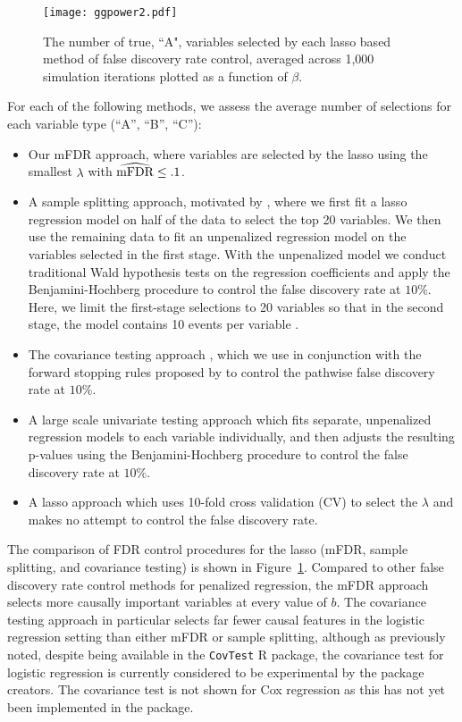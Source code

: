 \begin{figure} [htb!]
 \centering
  \texttt{[image: ggpower2.pdf]}
  \caption{\label{Fig:lassopower} The number of true, ``A", variables selected by each lasso based method of false discovery rate control, averaged across 1,000 simulation iterations plotted as a function of $\beta$. }
\end{figure}

For each of the following methods, we assess the average number of selections for each variable type (``A'', ``B'', ``C''):
\begin{itemize}
\item Our mFDR approach, where variables are selected by the lasso using the smallest $\lambda$ with $\widehat{\textrm{mFDR}} \leq .1$.
\item A sample splitting approach, motivated by \citet{Sample_Splitting}, where we first fit a lasso regression model on half of the data to select the top 20 variables. We then use the remaining data to fit an unpenalized regression model on the variables selected in the first stage. With the unpenalized model we conduct traditional Wald hypothesis tests on the regression coefficients and apply the Benjamini-Hochberg procedure \citep{BH_1995} to control the false discovery rate at $10\%$. Here, we limit the first-stage selections to 20 variables so that in the second stage, the model contains 10 events per variable \citep{peduzzi_epv}.
\item The covariance testing approach \citep{CovTest}, which we use in conjunction with the forward stopping rules proposed by \citet{GSell2016} to control the pathwise false discovery rate at $10\%$. 
\item A large scale univariate testing approach which fits separate, unpenalized regression models to each variable individually, and then adjusts the resulting p-values using the Benjamini-Hochberg procedure to control the false discovery rate at $10\%$.
\item A lasso approach which uses 10-fold cross validation (CV) to select the $\lambda$ and makes no attempt to control the false discovery rate.
\end{itemize}


The comparison of FDR control procedures for the lasso (mFDR, sample splitting, and covariance testing) is shown in Figure~\ref{Fig:lassopower}.  Compared to other false discovery rate control methods for penalized regression, the mFDR approach selects more causally important variables at every value of $b$. The covariance testing approach in particular selects far fewer causal features in the logistic regression setting than either mFDR or sample splitting, although as previously noted, despite being available in the {\tt CovTest} R package, the covariance test for logistic regression is currently considered to be experimental by the package creators.  The covariance test is not shown for Cox regression as this has not yet been implemented in the package.


